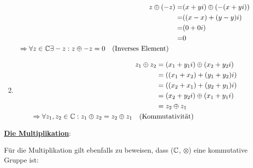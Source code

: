 \documentclass[main.tex]{subfiles}
\begin{document}
\begin{Beweis}
\begin{enumerate}
\begin{align*}
								  z \oplus (-z) =& (x + yi) \oplus (-(x + yi)) \\
								  			  =& ((x - x) + (y - y)i) \\
											  =& (0 + 0i) \\
											  =& 0  \\
						\Rightarrow \forall z \in \mathbb{C} \exists -z: z \oplus -z = 0 \quad \text{(Inverses Element)} \qquad &
	  			  \end{align*}
			\item \begin{align*}
						z_1 \oplus z_2 &= (x_1 + y_1i) \oplus (x_2 + y_2i) \\
									   &= ((x_1 + x_2) + (y_1 + y_2)i) \\
									   &= ((x_2 + x_1) + (y_2 + y_1)i) \\
									   &= (x_2 + y_2i) \oplus (x_1 + y_1i) \\
									   &= z_2 \oplus z_1 \\
						\Rightarrow \forall z_1, z_2 \in \mathbb{C}: z_1 \oplus z_2 = z_2 \oplus z_1 \quad \text{(Kom}&\text{mutativität)}
				  \end{align*}
		\end{enumerate}
		\newpage
		\underline{\textbf{Die Multiplikation}}:

		Für die Multiplikation gilt ebenfalls zu beweisen, dass ($\mathbb{C}$, $\otimes$) eine kommutative Gruppe ist:


\end{Beweis}
\end{document}
